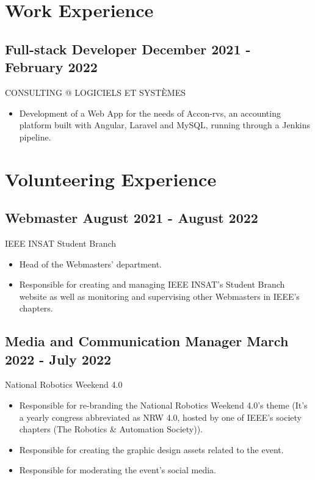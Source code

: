 \documentclass[a4,10pt]{article}
\newcommand{\subtext}[1]{
#1\par\vspace{-0.2cm}}
\newenvironment{zitemize}{
\begin{itemize}\itemsep0pt \parskip0pt \parsep1pt}
{\end{itemize}\vspace{-0.5cm}}
\begin{document}
\section{Work Experience}
\subsection*{ Full-stack Developer \hfill December 2021 - February 2022} 
\subtext{CONSULTING @ LOGICIELS ET SYSTÈMES\hfill } 
    \begin{zitemize}
        \item  Development of a Web App for the needs of Accon-rvs, an accounting platform built with Angular, Laravel and MySQL, running through a Jenkins pipeline.
    \end{zitemize}
    


\section{Volunteering Experience}

\subsection*{Webmaster \hfill August 2021 - August 2022} 
\subtext{IEEE INSAT Student Branch\hfill } 
    \begin{zitemize}
        \item   Head of the Webmasters' department.
        \item  Responsible for creating and managing IEEE INSAT's Student Branch website as well as monitoring and supervising other Webmasters in IEEE's chapters.
                        

    \end{zitemize}
    
\subsection*{Media and Communication Manager \hfill March 2022 - July 2022} 
\subtext{National Robotics Weekend 4.0\hfill } 
    \begin{zitemize}
        \item Responsible for re-branding the National Robotics Weekend 4.0's theme (It's a yearly congress abbreviated as NRW 4.0, hosted by one of IEEE's society chapters (The Robotics & Automation Society)).
        \item Responsible for creating the graphic design assets related to the event.
        \item Responsible for moderating the event's social media.
    \end{zitemize}
\end{document}
